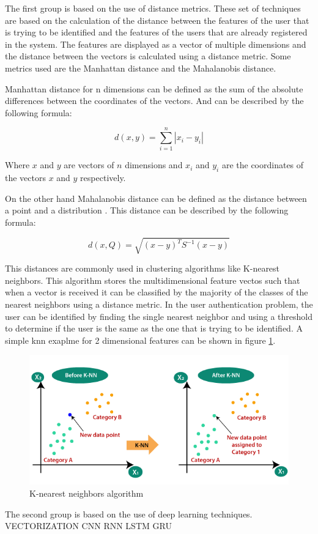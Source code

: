 The first group is based on the use of distance metrics. These set of techniques are based on the calculation of the distance between the features of the user that is trying to be identified and the features of the users that are already registered in the system. The features are displayed as a vector of multiple dimensions and the distance between the vectors is calculated using a distance metric. Some metrics used are the Manhattan distance and the Mahalanobis distance.

Manhattan distance for n dimensions can be defined as the sum of the absolute differences between the coordinates of the vectors. And can be described by the following formula:

\begin{equation}
	d(x,y) = \sum_{i=1}^{n} |x_i - y_i|
\end{equation}

Where $x$ and $y$ are vectors of $n$ dimensions and $x_i$ and $y_i$ are the coordinates of the vectors $x$ and $y$ respectively.


On the other hand Mahalanobis distance can be defined as the distance between a point and a distribution \cite{de2000mahalanobis}. This distance can be described by the following formula:

\begin{equation}
	d(x,Q) = \sqrt{(x-y)^T S^{-1} (x-y)}
\end{equation}

This distances are commonly used in clustering algorithms like K-nearest neighbors. This algorithm stores the multidimensional feature vectos such that when a vector is received it can be classified by the majority of the classes of the nearest neighbors using a distance metric. In the user authentication problem, the user can be identified by finding the single nearest neighbor and using a threshold to determine if the user is the same as the one that is trying to be identified. A simple knn exaplme for 2 dimensional features can be shown in figure \ref{fig:knn}.

\begin{figure}[h]
    \centering
    \includegraphics[width=0.7\linewidth]{images/knn}
    \caption{K-nearest neighbors algorithm \cite{knn}}
    \label{fig:knn}
\end{figure}

The second group is based on the use of deep learning techniques. 
VECTORIZATION
CNN
RNN
LSTM
GRU

